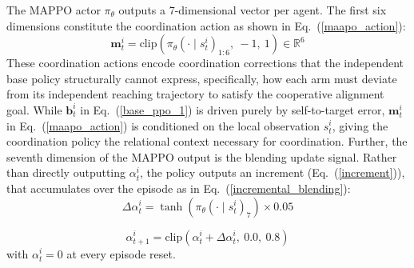 \documentclass[lettersize,journal]{IEEEtran}
\begin{document}
The MAPPO actor $\pi_\theta$ outputs a 7-dimensional vector per agent. The first six dimensions constitute the coordination action as shown in Eq.~(\ref{maapo_action}):
\begin{equation}
\mathbf{m}_t^i = \mathrm{clip}\left( \pi_{\theta}(\cdot \mid s_t^i)_{1:6},\ -1,\ 1 \right) \in \mathbb{R}^6
\label{maapo_action}
\end{equation}
These coordination actions encode coordination corrections that the independent base policy structurally cannot express, specifically, how each arm must deviate from its independent reaching trajectory to satisfy the cooperative alignment goal. While $\mathbf{b}_t^i$ in Eq.~(\ref{base_ppo_1}) is driven purely by self-to-target error, $\mathbf{m}_t^i$ in Eq.~(\ref{maapo_action}) is conditioned on the local observation $s_t^i$, giving the coordination policy the relational context necessary for coordination. Further, the seventh dimension of the MAPPO output is the blending update signal. Rather than directly outputting $\alpha_t^i$, the policy outputs an increment (Eq.~(\ref{increment})), that accumulates over the episode as in Eq.~(\ref{incremental_blending}):
\begin{equation}
\Delta \alpha_t^i = \tanh\left( \pi_{\theta}(\cdot \mid s_t^i)_{7} \right) \times 0.05
\label{increment}
\end{equation}

\begin{equation}
\alpha_{t+1}^i = \mathrm{clip}\left( \alpha_t^i + \Delta \alpha_t^i,\ 0.0,\ 0.8 \right)
\label{incremental_blending}
\end{equation}
with $\alpha_t^i = 0$ at every episode reset. 
\end{document}
